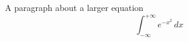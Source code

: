 \documentclass{article}
\begin{document}
A paragraph about a larger equation
\begin{equation}
\int_{-\infty}^{+\infty} e^{-x^2} \, dx
\end{equation}
\end{document}
